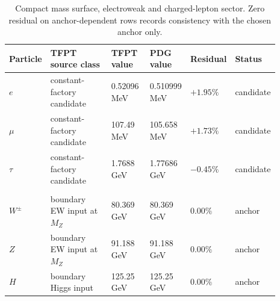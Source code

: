 \documentclass[11pt,a4paper]{article}
\theoremstyle{definition}
\theoremstyle{remark}
\begin{document}
\begin{table}[p]
\centering
\scriptsize
\setlength{\tabcolsep}{3pt}
\begin{tabularx}{\linewidth}{@{}>{\raggedright\arraybackslash}p{0.10\linewidth}>{\raggedright\arraybackslash}p{0.27\linewidth}>{\raggedleft\arraybackslash}p{0.15\linewidth}>{\raggedleft\arraybackslash}p{0.15\linewidth}>{\raggedleft\arraybackslash}p{0.10\linewidth}>{\raggedright\arraybackslash}p{0.12\linewidth}@{}}
\toprule
Particle & TFPT source class & TFPT value & PDG value & Residual & Status \\
\midrule
$e$ & constant-factory candidate & \num{0.52096} MeV & \num{0.510999} MeV & $+1.95\%$ & candidate \\
$\mu$ & constant-factory candidate & \num{107.49} MeV & \num{105.658} MeV & $+1.73\%$ & candidate \\
$\tau$ & constant-factory candidate & \num{1.7688} GeV & \num{1.77686} GeV & $-0.45\%$ & candidate \\
\midrule
\multicolumn{6}{@{}l}{\textit{Calibration surface (anchor-dependent; zero residual = anchor consistency, not prediction):}} \\
$W^\pm$ & boundary EW input at $M_Z$ & \num{80.369} GeV & \num{80.369} GeV & $0.00\%$ & anchor \\
$Z$ & boundary EW input at $M_Z$ & \num{91.188} GeV & \num{91.188} GeV & $0.00\%$ & anchor \\
$H$ & boundary Higgs input & \num{125.25} GeV & \num{125.25} GeV & $0.00\%$ & anchor \\
\bottomrule
\end{tabularx}
\caption{Compact mass surface, electroweak and charged-lepton sector. Zero residual on anchor-dependent rows records consistency with the chosen anchor only.}
\label{tab:sm-mass-ledger-ew}
\end{table}
\end{document}
